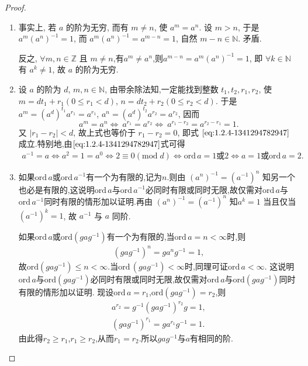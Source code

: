 \documentclass[../../main.tex]{subfiles}%
\begin{document}
\begin{proof}
\begin{enumerate}[(1)]
\item 事实上, 若 \( a \) 的阶为无穷, 而有 \( m \neq n \), 使 \( a^m = a^n \). 设 \( m > n \), 于是 \( a^m(a^n)^{-1} = 1 \), 而 \( a^m(a^n)^{-1} = a^{m-n} = 1 \), 自然 \( m - n \in \mathbb{N} \). 矛盾.

反之, \( \forall m, n \in \mathbb{Z} \) 且 \( m \neq n \),有\( a^m \neq a^n \),则\( a^{m-n} = a^m(a^n)^{-1} = 1 \), 即 \( \forall k \in \mathbb{N} \) 有 \( a^k \neq 1 \), 故 \( a \) 的阶为无穷.

\item 设 \( a \) 的阶为 \( d \), \( m, n \in \mathbb{N} \), 由带余除法知,一定能找到整数 \( t_1, t_2, r_1, r_2 \), 使 \( m = dt_1 + r_1 (0 \leqslant r_1 < d) \), \( n = dt_2 + r_2 (0 \leqslant r_2 < d) \). 于是 \( a^m = (a^d)^{t_1} a^{r_1} = a^{r_1} \), \( a^n = (a^d)^{t_2} a^{r_2} = a^{r_2} \), 因而
\[
a^m = a^n \iff \ a^{r_1} = a^{r_2} \iff  \ a^{r_1 - r_2} = a^{r_2 - r_1} = 1.
\]
又 \( |r_1 - r_2| < d \), 故上式也等价于 \( r_1 - r_2 = 0 \), 即式 \(\eqref{eq:1.2.4-1341294782947}\) 成立.特别地,由\(\eqref{eq:1.2.4-1341294782947}\)式可得
\begin{align*}
a^{-1}=a\Longleftrightarrow a^2=1=a^0\Longleftrightarrow 2\equiv 0\left( \mathrm{mod}\;d \right) \Longleftrightarrow \mathrm{ord}\,a=1\text{或}2\Longleftrightarrow a=1\text{或ord}\,a=2.
\end{align*}

\item 如果$\text{ord}\,a$或$\text{ord}\,a^{-1}$有一个为有限的,记为$n$.则由 \( (a^n)^{-1} = (a^{-1})^n \) 知另一个也必是有限的,这说明$\text{ord}\,a$与$\text{ord}\,a^{-1}$必同时有限或同时无限,故仅需对$\text{ord}\,a$与$\text{ord}\,a^{-1}$同时有限的情形加以证明.再由 \( (a^n)^{-1} = (a^{-1})^n \) 知\( a^k = 1 \) 当且仅当 \( (a^{-1})^k = 1 \), 故 \( a^{-1} \) 与 \( a \) 同阶.

如果$\text{ord}\,a$或$\text{ord}(gag^{-1})$有一个为有限的,当$\text{ord}\,a = n<\infty$时,则
\begin{align*}
(gag^{-1})^n=ga^ng^{-1}=1,
\end{align*}
故$\text{ord}(gag^{-1})\leqslant n<\infty.$当$\text{ord}\,(gag^{-1})<\infty$时,同理可证$\text{ord}\,a <\infty.$
这说明$\text{ord}\,a$与$\text{ord}(gag^{-1})$必同时有限或同时无限,故仅需对$\text{ord}\,a$与$\text{ord}(gag^{-1})$同时有限的情形加以证明.
现设$\text{ord}\,a = r_1$,$\text{ord}(gag^{-1}) = r_2$,则
\begin{align*}
a^{r_2} = g^{-1}(gag^{-1})^{r_2}g = 1, \\
(gag^{-1})^{r_1} = ga^{r_1}g^{-1} = 1.
\end{align*}
由此得$r_2 \geqslant r_1$,$r_1 \geqslant r_2$,从而$r_1 = r_2$.所以$gag^{-1}$与$a$有相同的阶.


\end{enumerate}
\end{proof}
\end{document}
